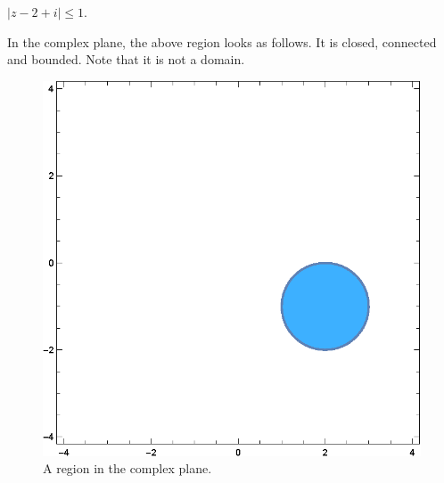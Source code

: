 \documentclass[12pt]{book}
\begin{document}
\begin{exmp}
    $|z - 2 + i| \leq 1.$
\end{exmp}
In the complex plane, the above region looks as follows. It is closed, connected and bounded. Note that it is not a domain.
\begin{figure}[H]
    \centering
    \includegraphics[scale = 0.7]{./figs/chapter_1/region_plot_1.eps}
    \caption{A region in the complex plane.}
\end{figure}
\end{document}
